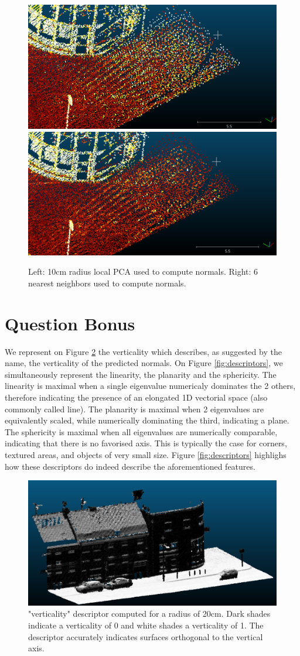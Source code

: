\documentclass[a4paper]{article}
\begin{document}
\begin{figure}[ht]
  \centering
  \includegraphics[width=0.46\linewidth]{figures/zoom_r=0_1.png}
  \includegraphics[width=0.46\linewidth]{figures/zoom_k=6.png}
  \caption{Left: 10cm radius local PCA used to compute normals. 
  Right: 6 nearest neighbors used to compute normals.} 
  \label{fig:local_PCA_neighbor_zoom}
\end{figure}

\section*{Question Bonus}
We represent on Figure \ref{fig:verticality} the verticality which describes, as suggested by the name, the verticality of the predicted normals.
On Figure \ref{fig:descriptors}, we simultaneously represent the linearity, the planarity and the sphericity. The linearity is maximal when a single
eigenvalue numericaly dominates the 2 others, therefore indicating the presence of an elongated 1D vectorial space (also commonly called line).
The planarity is maximal when 2 eigenvalues are equivalently scaled, while numerically dominating the third, indicating a plane. The sphericity is maximal when 
all eigenvalues are numerically comparable, indicating that there is no favorised axis. This is typically the case for corners, textured areas, and objects of very small size.
Figure \ref{fig:descriptors} highlighs how these descriptors do indeed describe the aforementioned features.



\begin{figure}[ht]
  \centering
  \includegraphics[width=0.8\linewidth]{figures/verticality.png}
  \caption{"verticality" descriptor computed for a radius of 20cm. Dark shades indicate a verticality of 0 and white shades a verticality of 1.
  The descriptor accurately indicates surfaces orthogonal to the vertical axis.} 
  \label{fig:verticality}
\end{figure}
\end{document}
